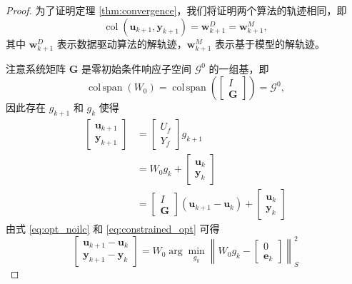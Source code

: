 \begin{proof}
	为了证明定理 \ref{thm:convergence}，我们将证明两个算法的轨迹相同，即
	\begin{equation}
		\operatorname{col}(\mathbf{u}_{k+1}, \mathbf{y}_{k+1}) = \mathbf{w}_{k+1}^D = \mathbf{w}_{k+1}^M,
		\label{eq:traj_eq}
	\end{equation}
	其中 \(\mathbf{w}_{k+1}^D\) 表示数据驱动算法的解轨迹，\(\mathbf{w}_{k+1}^M\) 表示基于模型的解轨迹。
	
	注意系统矩阵 \(\mathbf{G}\) 是零初始条件响应子空间 \(\mathcal{G}^0\) 的一组基，即
	\begin{equation}
		\operatorname{col\,span}(W_0) = \operatorname{col\,span}\left( \begin{bmatrix} I \\ \mathbf{G} \end{bmatrix} \right) = \mathcal{G}^0,
		\label{eq:W0_basis}
	\end{equation}
	因此存在 \(g_{k+1}\) 和 \(g_k\) 使得
	\begin{equation}
		\begin{aligned}
			\begin{bmatrix} \mathbf{u}_{k+1} \\ \mathbf{y}_{k+1} \end{bmatrix}
			&= \begin{bmatrix} U_f \\ Y_f \end{bmatrix} g_{k+1} \\
			&= W_0 g_k + \begin{bmatrix} \mathbf{u}_k \\ \mathbf{y}_k \end{bmatrix} \\
			&= \begin{bmatrix} I \\ \mathbf{G} \end{bmatrix} (\mathbf{u}_{k+1} - \mathbf{u}_k) + \begin{bmatrix} \mathbf{u}_k \\ \mathbf{y}_k \end{bmatrix}
		\end{aligned}
		\label{eq:W0_relation}
	\end{equation}
	由式 \eqref{eq:opt_noilc} 和 \eqref{eq:constrained_opt} 可得
	\begin{equation}
		\begin{bmatrix} \mathbf{u}_{k+1} - \mathbf{u}_k \\ \mathbf{y}_{k+1} - \mathbf{y}_k \end{bmatrix} = W_0 \arg\min_{g_k} \left\| W_0 g_k - \begin{bmatrix} 0 \\ \mathbf{e}_k \end{bmatrix} \right\|_S^2

\end{equation}
\end{proof}
